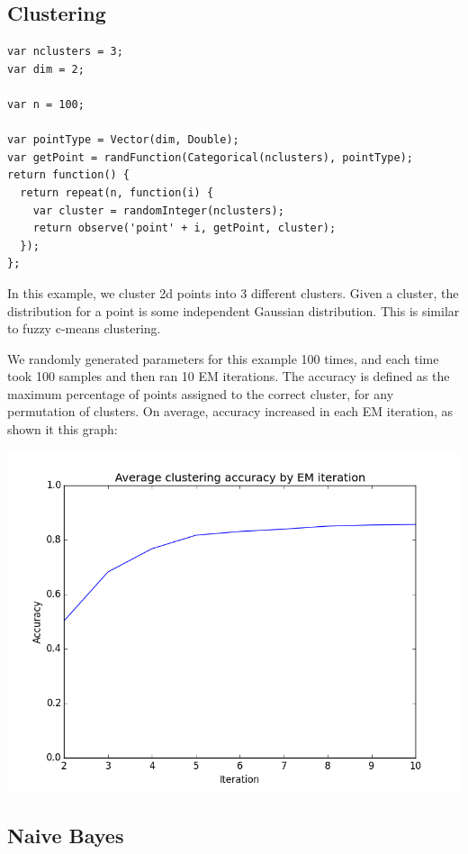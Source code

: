 \documentclass{article}
\begin{document}
  \subsection{Clustering}
{\small
\begin{verbatim}
var nclusters = 3;
var dim = 2;

var n = 100;

var pointType = Vector(dim, Double);
var getPoint = randFunction(Categorical(nclusters), pointType);
return function() {
  return repeat(n, function(i) {
    var cluster = randomInteger(nclusters);
    return observe('point' + i, getPoint, cluster);
  });
};
\end{verbatim}
}

In this example, we cluster 2d points into 3 different clusters.  Given a cluster, the distribution for a point is some independent Gaussian distribution.  This is similar to fuzzy c-means clustering.

We randomly generated parameters for this example 100 times, and each time took 100 samples and then ran 10 EM iterations.  The accuracy is defined as the maximum percentage of points assigned to the correct cluster, for any permutation of clusters.  On average, accuracy increased in each EM iteration, as shown it this graph:

\begin{center}
\includegraphics[scale=0.4]{cluster_accuracy.png}
\end{center}

\subsection{Naive Bayes}
\end{document}
